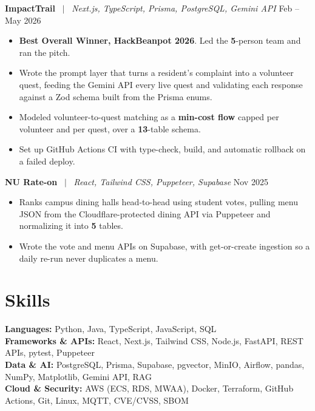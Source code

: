\documentclass[letterpaper,10pt]{article}
\newcommand{\entrysize}{\fontsize{10.5}{12}\selectfont}
\newif\ifentrygap
\newcommand{\entrygapsize}{6pt}
\newcommand{\entryfirstgap}{0.4pt}
\newcommand{\entrysep}{\ifentrygap\vspace{\entrygapsize}\else\vspace{\entryfirstgap}\fi\global\entrygaptrue}
\let\entryorigsection\section
\renewcommand{\section}{\global\entrygapfalse\entryorigsection}
\newcommand{\project}[3]{\entrysep{\entrysize\textbf{#1}} \ $\vert$ \ \textit{#2} \hfill #3}
\begin{document}
\project{ImpactTrail}{Next.js, TypeScript, Prisma, PostgreSQL, Gemini API}{Feb -- May 2026}
\begin{itemize}
  \item \textbf{Best Overall Winner, HackBeanpot 2026}. Led the \textbf{5}-person team and ran the pitch.
  \item Wrote the prompt layer that turns a resident's complaint into a volunteer quest, feeding the Gemini API every live
        quest and validating each response against a Zod schema built from the Prisma enums.
  \item Modeled volunteer-to-quest matching as a \textbf{min-cost flow} capped per volunteer and per quest, over a \textbf{13}-table schema.
  \item Set up GitHub Actions CI with type-check, build, and automatic rollback on a failed deploy.
\end{itemize}

\project{NU Rate-on}{React, Tailwind CSS, Puppeteer, Supabase}{Nov 2025}
\begin{itemize}
  \item Ranks campus dining halls head-to-head using student votes, pulling menu JSON from the Cloudflare-protected
        dining API via Puppeteer and normalizing it into \textbf{5} tables.
  \item Wrote the vote and menu APIs on Supabase, with get-or-create ingestion so a daily re-run never duplicates a menu.
\end{itemize}

\section{Skills}

\textbf{Languages:} Python, Java, TypeScript, JavaScript, SQL \\
\textbf{Frameworks \& APIs:} React, Next.js, Tailwind CSS, Node.js, FastAPI, REST APIs, pytest, Puppeteer \\
\textbf{Data \& AI:} PostgreSQL, Prisma, Supabase, pgvector, MinIO, Airflow, pandas, NumPy, Matplotlib, Gemini API, RAG \\
\textbf{Cloud \& Security:} AWS (ECS, RDS, MWAA), Docker, Terraform, GitHub Actions, Git, Linux, MQTT, CVE/CVSS, SBOM
\end{document}
